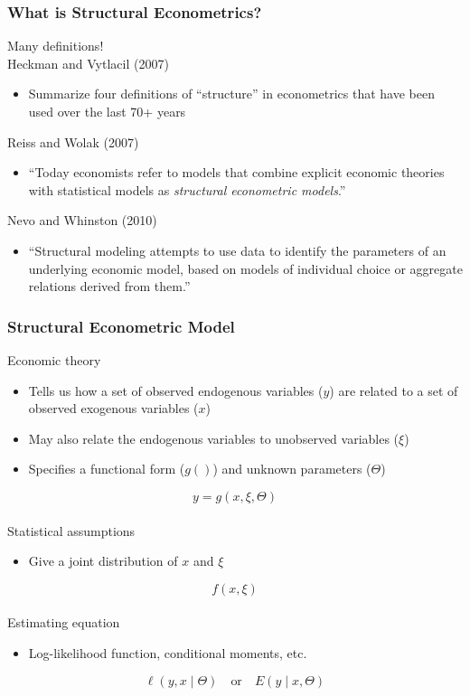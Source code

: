 \documentclass{beamer}
\begin{document}
\begin{frame}\frametitle{What is Structural Econometrics?}
    Many definitions! \\
    \vspace{3ex}
    Heckman and Vytlacil (2007)
    \begin{itemize}
    	\item Summarize four definitions of ``structure'' in econometrics that have been used over the last 70+ years
    \end{itemize}
    \vspace{3ex}
    Reiss and Wolak (2007)
    \begin{itemize}
    	\item ``Today economists refer to models that combine explicit economic theories with statistical models as \emph{structural econometric models}.''
    \end{itemize}
    \vspace{3ex}
    Nevo and Whinston (2010)
    \begin{itemize}
    	\item ``Structural modeling attempts to use data to identify the parameters of an underlying economic model, based on models of individual choice or aggregate relations derived from them.''
    \end{itemize}
\end{frame}

\begin{frame}\frametitle{Structural Econometric Model}
    Economic theory
    \begin{itemize}
        \item Tells us how a set of observed endogenous variables ($y$) are related to a set of observed exogenous variables ($x$)
        \item May also relate the endogenous variables to unobserved variables ($\xi$)
        \item Specifies a functional form ($g()$) and unknown parameters ($\Theta$)
    \end{itemize}
    \vspace{1ex}
    $$y = g(x, \xi, \Theta)$$ \\
    \vspace{2ex}
    Statistical assumptions
    \begin{itemize}
        \item Give a joint distribution of $x$ and $\xi$
    \end{itemize}
    \vspace{1ex}
    $$f(x, \xi)$$ \\
    \vspace{2ex}
    Estimating equation
    \begin{itemize}
    	\item Log-likelihood function, conditional moments, etc.
    \end{itemize}
    \vspace{1ex}
    $$\ell(y, x \mid \Theta) \quad \text{or} \quad E(y \mid x, \Theta)$$
\end{frame}
\end{document}

